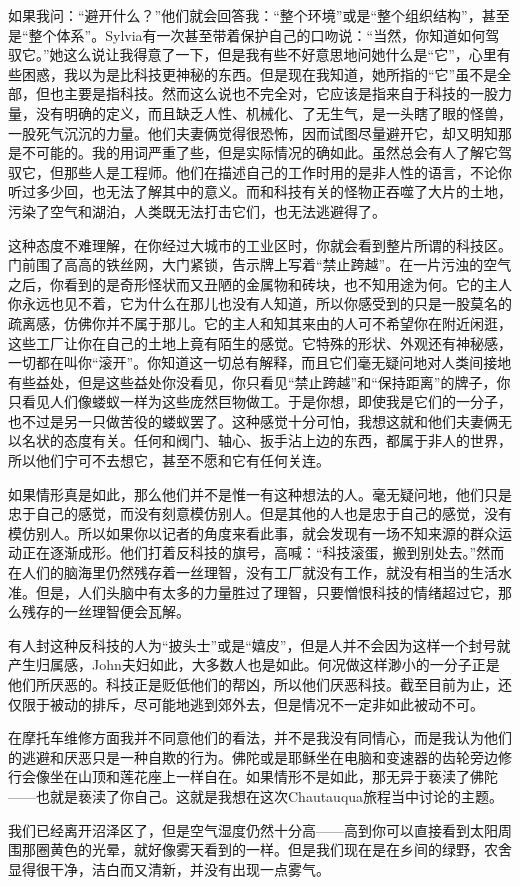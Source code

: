 \documentclass[UTF8]{article}
\begin{document}
\par 如果我问：“避开什么？”他们就会回答我：“整个环境”或是“整个组织结构”，甚至是“整个体系”。Sylvia有一次甚至带着保护自己的口吻说：“当然，你知道如何驾驭它。”她这么说让我得意了一下，但是我有些不好意思地问她什么是“它”，心里有些困惑，我以为是比科技更神秘的东西。但是现在我知道，她所指的“它”虽不是全部，但也主要是指科技。然而这么说也不完全对，它应该是指来自于科技的一股力量，没有明确的定义，而且缺乏人性、机械化、了无生气，是一头瞎了眼的怪兽，一股死气沉沉的力量。他们夫妻俩觉得很恐怖，因而试图尽量避开它，却又明知那是不可能的。我的用词严重了些，但是实际情况的确如此。虽然总会有人了解它驾驭它，但那些人是工程师。他们在描述自己的工作时用的是非人性的语言，不论你听过多少回，也无法了解其中的意义。而和科技有关的怪物正吞噬了大片的土地，污染了空气和湖泊，人类既无法打击它们，也无法逃避得了。
\par 这种态度不难理解，在你经过大城市的工业区时，你就会看到整片所谓的科技区。门前围了高高的铁丝网，大门紧锁，告示牌上写着“禁止跨越”。在一片污浊的空气之后，你看到的是奇形怪状而又丑陋的金属物和砖块，也不知用途为何。它的主人你永远也见不着，它为什么在那儿也没有人知道，所以你感受到的只是一股莫名的疏离感，仿佛你并不属于那儿。它的主人和知其来由的人可不希望你在附近闲逛，这些工厂让你在自己的土地上竟有陌生的感觉。它特殊的形状、外观还有神秘感，一切都在叫你“滚开”。你知道这一切总有解释，而且它们毫无疑问地对人类间接地有些益处，但是这些益处你没看见，你只看见“禁止跨越”和“保持距离”的牌子，你只看见人们像蝼蚁一样为这些庞然巨物做工。于是你想，即使我是它们的一分子，也不过是另一只做苦役的蝼蚁罢了。这种感觉十分可怕，我想这就和他们夫妻俩无以名状的态度有关。任何和阀门、轴心、扳手沾上边的东西，都属于非人的世界，所以他们宁可不去想它，甚至不愿和它有任何关连。
\par 如果情形真是如此，那么他们并不是惟一有这种想法的人。毫无疑问地，他们只是忠于自己的感觉，而没有刻意模仿别人。但是其他的人也是忠于自己的感觉，没有模仿别人。所以如果你以记者的角度来看此事，就会发现有一场不知来源的群众运动正在逐渐成形。他们打着反科技的旗号，高喊：“科技滚蛋，搬到别处去。”然而在人们的脑海里仍然残存着一丝理智，没有工厂就没有工作，就没有相当的生活水准。但是，人们头脑中有太多的力量胜过了理智，只要憎恨科技的情绪超过它，那么残存的一丝理智便会瓦解。
\par 有人封这种反科技的人为“披头士”或是“嬉皮”，但是人并不会因为这样一个封号就产生归属感，John夫妇如此，大多数人也是如此。何况做这样渺小的一分子正是他们所厌恶的。科技正是贬低他们的帮凶，所以他们厌恶科技。截至目前为止，还仅限于被动的排斥，尽可能地逃到郊外去，但是情况不一定非如此被动不可。
\par 在摩托车维修方面我并不同意他们的看法，并不是我没有同情心，而是我认为他们的逃避和厌恶只是一种自欺的行为。佛陀或是耶稣坐在电脑和变速器的齿轮旁边修行会像坐在山顶和莲花座上一样自在。如果情形不是如此，那无异于亵渎了佛陀——也就是亵渎了你自己。这就是我想在这次Chautauqua旅程当中讨论的主题。
\par 我们已经离开沼泽区了，但是空气湿度仍然十分高——高到你可以直接看到太阳周围那圈黄色的光晕，就好像雾天看到的一样。但是我们现在是在乡间的绿野，农舍显得很干净，洁白而又清新，并没有出现一点雾气。
\end{document}
